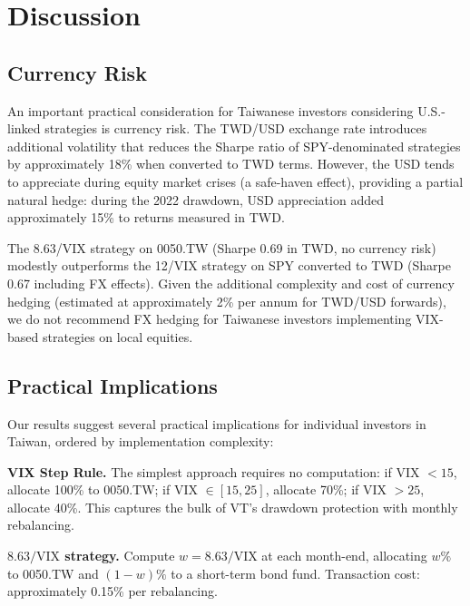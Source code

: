 
\section{Discussion}
\label{sec:discussion}

\subsection{Currency Risk}

An important practical consideration for Taiwanese investors considering U.S.-linked strategies is currency risk. The TWD/USD exchange rate introduces additional volatility that reduces the Sharpe ratio of SPY-denominated strategies by approximately 18\% when converted to TWD terms. However, the USD tends to appreciate during equity market crises (a safe-haven effect), providing a partial natural hedge: during the 2022 drawdown, USD appreciation added approximately 15\% to returns measured in TWD.

The 8.63/VIX strategy on 0050.TW (Sharpe 0.69 in TWD, no currency risk) modestly outperforms the 12/VIX strategy on SPY converted to TWD (Sharpe 0.67 including FX effects). Given the additional complexity and cost of currency hedging (estimated at approximately 2\% per annum for TWD/USD forwards), we do not recommend FX hedging for Taiwanese investors implementing VIX-based strategies on local equities.

\subsection{Practical Implications}

Our results suggest several practical implications for individual investors in Taiwan, ordered by implementation complexity:

\textbf{VIX Step Rule.} The simplest approach requires no computation: if VIX $< 15$, allocate 100\% to 0050.TW; if VIX $\in [15, 25]$, allocate 70\%; if VIX $> 25$, allocate 40\%. This captures the bulk of VT's drawdown protection with monthly rebalancing.

\textbf{$8.63/\text{VIX}$ strategy.} Compute $w = 8.63 / \text{VIX}$ at each month-end, allocating $w\%$ to 0050.TW and $(1-w)\%$ to a short-term bond fund. Transaction cost: approximately 0.15\% per rebalancing.

